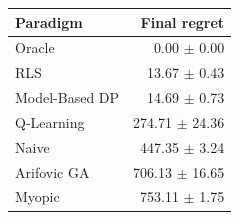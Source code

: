 \begin{tabular}{lr}
\toprule
Paradigm & Final regret \\
\midrule
Oracle & 0.00 $\pm$ 0.00 \\
RLS & 13.67 $\pm$ 0.43 \\
Model-Based DP & 14.69 $\pm$ 0.73 \\
Q-Learning & 274.71 $\pm$ 24.36 \\
Naive & 447.35 $\pm$ 3.24 \\
Arifovic GA & 706.13 $\pm$ 16.65 \\
Myopic & 753.11 $\pm$ 1.75 \\
\bottomrule
\end{tabular}

